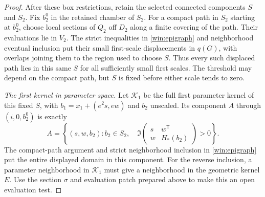 \begin{proof}
After these box restrictions, retain the selected connected
components $S$ and $S_2$.  Fix $b_2^0$ in the retained chamber of
$S_2$.  For a compact path in $S_2$ starting at $b_2^0$, choose
local sections of $Q_2$ off
$D_2$ along a finite covering of the path.  Their evaluations lie
in $V_2$.  The strict inequalities in \eqref{win:epigraph} and
neighborhood eventual inclusion put their small first-scale
displacements in $q(G)$, with overlaps joining them to the region
used to choose $S$.  Thus every such displaced path lies in this
same $S$ for all sufficiently small first scales.  The threshold
may depend on the compact path, but $S$ is fixed before either
scale tends to zero.

\emph{The first kernel in parameter space.}
Let $\mathcal K_1$ be the full first parameter kernel of this fixed
$S$, with $b_1=x_1+(e^2s,ew)$ and $b_2$ unscaled.  Its component
$A$ through $(i,0,b_2^0)$ is exactly
\begin{equation}\label{win:first-parameter-kernel}
 A=\left\{(s,w,b_2):b_2\in S_2,\quad
       \Im\begin{pmatrix}s&w^{\mathsf T}\\w&H_*(b_2)\end{pmatrix}>0\right\}.
\end{equation}
The compact-path argument and strict neighborhood inclusion in
\eqref{win:epigraph} put the entire displayed domain in this
component.  For the reverse inclusion, a parameter neighborhood in
$\mathcal K_1$ must give a neighborhood in the geometric kernel $E$.
Use the section $\sigma$ and evaluation patch prepared above to
make this an open evaluation test.


\end{proof}

